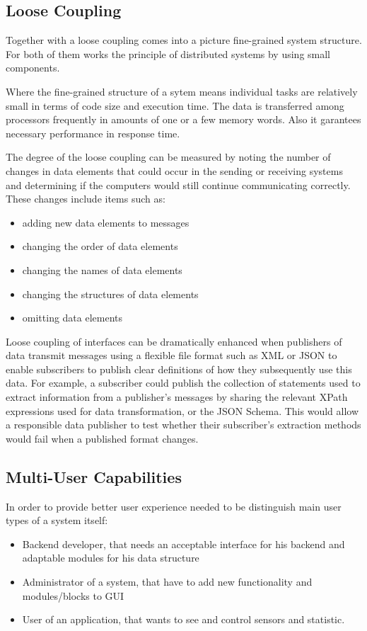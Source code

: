 \subsection {Loose Coupling}
Together with a loose coupling comes into a picture fine-grained system structure. For both of them works the principle of distributed systems by using small components.

Where the fine-grained structure of a sytem  means individual tasks are relatively small in terms of code size and execution time. The data is transferred among processors frequently in amounts of one or a few memory words. Also it garantees necessary performance in response time.

The degree of the loose coupling can be measured by noting the number of changes in data elements that could occur in the sending or receiving systems and determining if the computers would still continue communicating correctly. These changes include items such as:
\begin{itemize}
\item adding new data elements to messages
\item changing the order of data elements
\item changing the names of data elements
\item changing the structures of data elements
\item omitting data elements
\end{itemize}
Loose coupling of interfaces can be dramatically enhanced when publishers of data transmit messages using a flexible file format such as XML or JSON to enable subscribers to publish clear definitions of how they subsequently use this data. For example, a subscriber could publish the collection of statements used to extract information from a publisher's messages by sharing the relevant XPath expressions used for data transformation, or the JSON Schema. This would allow a responsible data publisher to test whether their subscriber's extraction methods would fail when a published format changes.

\subsection {Multi-User Capabilities}
In order to provide better user experience needed to be distinguish main user types of a system itself:
\begin{itemize}
\item Backend developer, that needs an acceptable interface for his backend and adaptable modules for his data structure
\item Administrator of a system, that have to add new functionality and modules/blocks to GUI
\item User of an application, that wants to see and control sensors and statistic.
\end{itemize}

